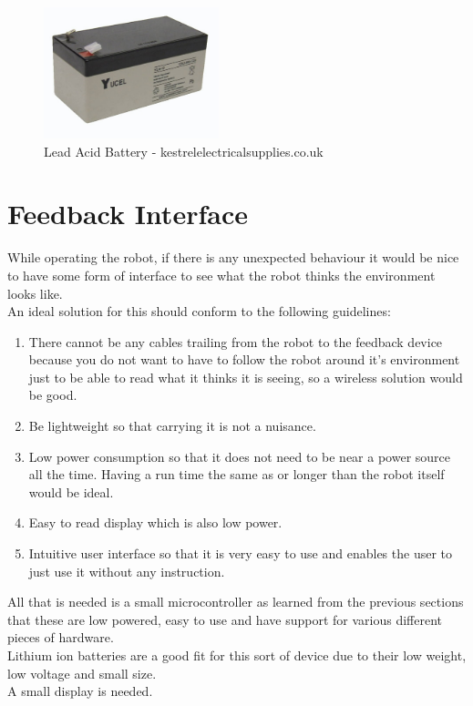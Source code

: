 \begin{figure}[h]
\centering
        \includegraphics[width=2.0in] {Images/lead-acid.jpg}
        \caption{Lead Acid Battery - kestrelelectricalsupplies.co.uk}
        \label{Lead Acid Battery}
\end{figure}

\section{Feedback Interface}
While operating the robot, if there is any unexpected behaviour it would be nice to have some form of interface to see what the robot thinks the environment looks like.
\\An ideal solution for this should conform to the following guidelines:
\begin{enumerate}
\item There cannot be any cables trailing from the robot to the feedback device because you do not want to have to follow the robot around it's environment just to be able to read what it thinks it is seeing, so a wireless solution would be good.
\item Be lightweight so that carrying it is not a nuisance.
\item Low power consumption so that it does not need to be near a power source all the time.  Having a run time the same as or longer than the robot itself would be ideal.
\item Easy to read display which is also low power.
\item Intuitive user interface so that it is very easy to use and enables the user to just use it without any instruction.
\end{enumerate}
All that is needed is a small microcontroller as learned from the previous sections that these are low powered, easy to use and have support for various different pieces of hardware.
\\Lithium ion batteries are a good fit for this sort of device due to their low weight, low voltage and small size.
\\A small display is needed.
